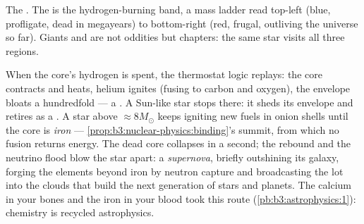 \begin{omfigure}

{\small The . The  is the
hydrogen-burning band, a mass ladder read top-left (blue,
profligate, dead in megayears) to bottom-right (red, frugal,
outliving the universe so far). Giants and  are not
oddities but chapters: the same star visits all three regions.}
\end{omfigure}

\begin{remark}\label{rem:b3:astrophysics:evolution}
When the core's hydrogen is spent, the thermostat logic replays:
the core contracts and heats, helium ignites (fusing to carbon
and oxygen), the envelope bloats a hundredfold --- a .
A Sun-like star stops there: it sheds its envelope and retires
as a . A star above $\approx8M_\odot$ keeps igniting
new fuels in onion shells until the core is \emph{iron} ---
\cref{prop:b3:nuclear-physics:binding}'s summit, from which no
fusion returns energy. The dead core collapses in a second; the
rebound and the neutrino flood blow the star apart: a
\emph{supernova}, briefly outshining its galaxy, forging the
elements beyond iron by neutron capture and broadcasting the lot
into the clouds that build the next generation of stars and
planets. The calcium in your bones and the iron in your blood
took this route (\cref{pb:b3:astrophysics:1}): chemistry is
recycled astrophysics.
\end{remark}

